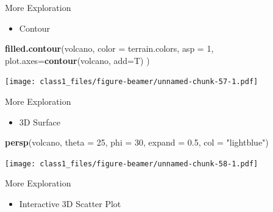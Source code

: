 \documentclass[ignorenonframetext,]{beamer}
\newenvironment{Shaded}{\begin{snugshade}}{\end{snugshade}}
\newcommand{\KeywordTok}[1]{\textcolor[rgb]{0.13,0.29,0.53}{\textbf{#1}}}
\newcommand{\DataTypeTok}[1]{\textcolor[rgb]{0.13,0.29,0.53}{#1}}
\newcommand{\DecValTok}[1]{\textcolor[rgb]{0.00,0.00,0.81}{#1}}
\newcommand{\FloatTok}[1]{\textcolor[rgb]{0.00,0.00,0.81}{#1}}
\newcommand{\StringTok}[1]{\textcolor[rgb]{0.31,0.60,0.02}{#1}}
\newcommand{\OperatorTok}[1]{\textcolor[rgb]{0.81,0.36,0.00}{\textbf{#1}}}
\newcommand{\NormalTok}[1]{#1}
\providecommand{\tightlist}{%
  \setlength{\itemsep}{0pt}\setlength{\parskip}{0pt}}
\begin{document}
\begin{frame}[fragile]{More Exploration}

\begin{itemize}
\tightlist
\item
  Contour
\end{itemize}

\begin{Shaded}
\begin{Highlighting}[]
\KeywordTok{filled.contour}\NormalTok{(volcano, }\DataTypeTok{color =}\NormalTok{ terrain.colors, }\DataTypeTok{asp =} \DecValTok{1}\NormalTok{, }\DataTypeTok{plot.axes=}\KeywordTok{contour}\NormalTok{(volcano, }\DataTypeTok{add=}\NormalTok{T) )}
\end{Highlighting}
\end{Shaded}

\texttt{[image: class1\_files/figure-beamer/unnamed-chunk-57-1.pdf]}

\end{frame}

\begin{frame}[fragile]{More Exploration}

\begin{itemize}
\tightlist
\item
  3D Surface
\end{itemize}

\begin{Shaded}
\begin{Highlighting}[]
\KeywordTok{persp}\NormalTok{(volcano, }\DataTypeTok{theta =} \DecValTok{25}\NormalTok{, }\DataTypeTok{phi =} \DecValTok{30}\NormalTok{, }\DataTypeTok{expand =} \FloatTok{0.5}\NormalTok{, }\DataTypeTok{col =} \StringTok{"lightblue"}\NormalTok{)}
\end{Highlighting}
\end{Shaded}

\texttt{[image: class1\_files/figure-beamer/unnamed-chunk-58-1.pdf]}

\end{frame}

\begin{frame}[fragile]{More Exploration}

\begin{itemize}
\tightlist
\item
  Interactive 3D Scatter Plot
\end{itemize}

\begin{Shaded}
\end{Shaded}

\end{frame}
\end{document}

